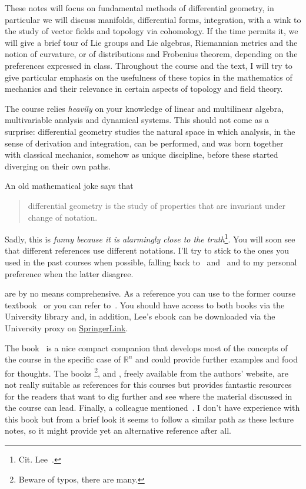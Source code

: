 \documentclass[nobib, a4paper]{tufte-book}
\theoremstyle{plain}
\theoremstyle{definition}
\theoremstyle{remark}
\newcommand{\R}{\mathbb{R}}
\begin{document}
These notes will focus on fundamental methods of differential geometry, in particular we will discuss manifolds, differential forms, integration, with a wink to the study of vector fields and topology via cohomology.
If the time permits it, we will give a brief tour of Lie groups and Lie algebras, Riemannian metrics and the notion of curvature, or of distributions and Frobenius theorem, depending on the preferences expressed in class.
Throughout the course and the text, I will try to give particular emphasis on the usefulness of these topics in the mathematics of mechanics and their relevance in certain aspects of topology and field theory.

The course relies \emph{heavily} on your knowledge of linear and multilinear algebra, multivariable analysis and dynamical systems.
This should not come as a surprise: differential geometry studies the natural space in which analysis, in the sense of derivation and integration, can be performed, and was born together with classical mechanics, somehow as unique discipline, before these started diverging on their own paths.

An old mathematical joke says that
\begin{quote}
  differential geometry is the study of properties that are invariant under change of notation.
\end{quote}
Sadly, this is \emph{funny because it is alarmingly close to the truth}\footnote{Cit. Lee~\cite{book:lee}.}.
You will soon see that different references use different notations. I'll try to stick to the ones you used in the past courses when possible, falling back to~\cite{book:lee} and~\cite{book:tu} and to my personal preference when the latter disagree.

 are by no means comprehensive.
As a reference you can use to the former course textbook~\cite{book:tu} or you can refer to~\cite{book:lee}.
You should have access to both books via the University library and, in addition, Lee's ebook can be downloaded via the University proxy on \href{https://link.springer.com/book/10.1007/978-1-4419-9982-5}{SpringerLink}.

The book~\cite{book:McInerney} is a nice compact companion that develops most of the concepts of the course in the specific case of $\R^n$ and could provide further examples and food for thoughts.
The books \cite{book:nicolaescu}\footnote{Beware of typos, there are many.}, \cite{book:crane} and \cite{lectures:nanda}, freely available from the authors' website, are not really suitable as references for this courses but provides fantastic resources for the readers that want to dig further and see where the material discussed in the course can lead.
Finally, a colleague mentioned~\cite{book:lang}. I don't have experience with this book but from a brief look it seems to follow a similar path as these lecture notes, so it might provide yet an alternative reference after all.
\end{document}

